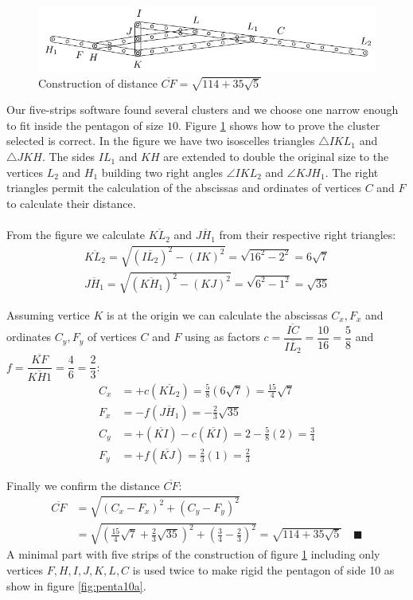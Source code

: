 \documentclass[11pt]{article}
\begin{document}
\begin{figure}[h]
 \centering
 \includegraphics[scale=1.3]{10/cluster10a}
 \caption{Construction of distance $\overline{CF} = \sqrt{114+35\sqrt5}$}
 \label{fig:cluster10a}
\end{figure}

Our five-strips software found several clusters and we choose one narrow enough to fit inside the pentagon of size $10$.
Figure \ref{fig:cluster10a} shows how to prove the cluster selected is correct. In the figure we have two isoscelles triangles $\triangle{IKL_1}$ and $\triangle{JKH}$. The sides $IL_1$ and $KH$ are extended to double the original size to the vertices $L_2$ and $H_1$ building two right angles $\angle{IKL_2}$ and $\angle{KJH_1}$. The right triangles permit the calculation of the abscissas and ordinates of vertices $C$ and $F$ to calculate their distance.
\\\\
From the figure we calculate $\overline{KL_2}$ and $\overline{JH_1}$ from their respective right triangles:
\begin{align}
\overline{KL_2} = \sqrt{(\overline{IL_2})^2 - (IK)^2} = \sqrt{16^2 - 2^2} = 6\sqrt7\\
\overline{JH_1} = \sqrt{(\overline{KH_1})^2 - (KJ)^2} = \sqrt{6^2 - 1^2} = \sqrt{35}
\end{align}

Assuming vertice $K$ is at the origin we can calculate the abscissas $C_x,F_x$ and ordinates $C_y,F_y$ of vertices $C$ and $F$ using as factors $c = \dfrac{\overline{IC}}{\overline{IL_2}} = \dfrac{10}{16} = \dfrac{5}8$ and $f = \dfrac{\overline{KF}}{\overline{KH1}}=\dfrac{4}6 = \dfrac{2}3$:
\begin{align}
C_x &= +c(\overline{KL_2}) = \frac{5}{8}(6\sqrt7) = \frac{15}{4}\sqrt7\\
F_x &= -f(\overline{JH_1}) = -\frac{2}{3}\sqrt{35}\\
C_y &= +(\overline{KI}) - c(\overline{KI}) = 2 - \frac{5}{8}(2) = \frac{3}4\\
F_y &= +f(\overline{KJ}) = \frac{2}{3}(1) = \frac{2}3
\end{align}

Finally we confirm the distance $\overline{CF}$:
\begin{align}
\overline{CF} &= \sqrt{(C_x - F_x)^2 + (C_y - F_y)^2}\nonumber\\
 &= \sqrt{\left(\frac{15}{4}\sqrt7 + \frac{2}{3}\sqrt{35}\right)^2
 + \left(\frac{3}4 - \frac{2}3\right)^2} %
 = \sqrt{114+35\sqrt5} \quad\blacksquare
\end{align}
A minimal part with five strips of the construction of figure \ref{fig:cluster10a} including only vertices $F,H,I,J,K,L,C$ is used twice to make rigid the pentagon of side 10 as show in figure \ref{fig:penta10a}.
\end{document}
